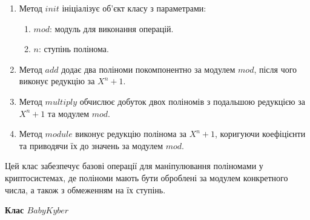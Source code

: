 \begin{enumerate}
    \item Метод $init$ ініціалізує об'єкт класу з параметрами:
    \begin{enumerate}
        \item $mod$: модуль для виконання операцій.
        \item $n$: ступінь полінома.
    \end{enumerate}

    \item Метод $add$ додає два поліноми покомпонентно за модулем $mod$, після чого виконує редукцію за $X^n + 1$.

    \item Метод $multiply$ обчислює добуток двох поліномів з подальшою редукцією за $X^n + 1$ та модулем $mod$.

    \item Метод $module$ виконує редукцію полінома за $X^n + 1$, коригуючи коефіцієнти та приводячи їх до значень за модулем $mod$.
\end{enumerate}


Цей клас забезпечує базові операції для маніпулювання поліномами у криптосистемах, де поліноми мають бути оброблені за модулем конкретного числа, а також з обмеженням на їх ступінь.


\textbf{Клас $BabyKyber$}

